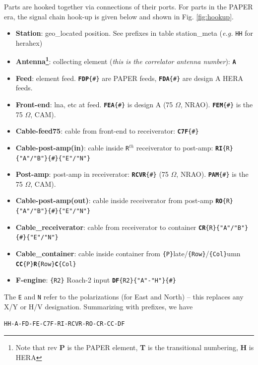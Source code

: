 \documentclass{article}[10pt]
\begin{document}
Parts are hooked together via connections of their ports.   For parts in the PAPER era, the signal chain hook-up is given below and shown in Fig. \ref{fig:hookup}.
\begin{itemize}\setlength\itemsep{-.3em}
	\item {\bf Station}: geo\_located position.  See prefixes in table station\_meta ({\em e.g.} {\tt HH} for herahex)
	\item {\bf Antenna\footnote{Note that rev {\bf P} is the PAPER element, {\bf T} is the transitional numbering, {\bf H} is HERA}}:  collecting element ({\em this is the correlator antenna number}):  {\tt{\bf A}}
	\item {\bf Feed}:  element feed.  {\tt {\bf FDP}\{\#\}} are PAPER feeds, {\tt {\bf FDA}\{\#\}} are design A HERA feeds.
	\item {\bf Front-end}:  lna, etc at feed.  {\tt {\bf FEA}\{\#\}} is design A (75 $\Omega$, NRAO).  {\tt {\bf FEM}\{\#\}} is the 75 $\Omega$, CAM).
	\item {\bf Cable-feed75}:  cable from front-end to receiverator: {\tt {\bf C7F}\{\#\}}
	\item {\bf Cable-post-amp(in)}:  cable inside {\tt R}$^{th}$ receiverator to post-amp: {\tt {\bf RI}\{R\}\{"A"/"B"\}\{\#\}\{"E"/"N"\}}
	\item {\bf Post-amp}:  post-amp in receiverator: {\tt {\bf RCVR}\{\#\}} (75 $\Omega$, NRAO).  {\tt {\bf PAM}\{\#\}} is the 75 $\Omega$, CAM).
	\item {\bf Cable-post-amp(out)}:  cable inside receiverator from post-amp {\tt {\bf RO}\{R\}\{"A"/"B"\}\{\#\}\{"E"/"N"\}}
	\item {\bf Cable\_receiverator}:  cable from receiverator to container {\tt {\bf CR}\{R\}\{"A"/"B"\}\{\#\}\{"E"/"N"\}}
	\item {\bf Cable\_container}:  cable inside container from {\tt\{P\}}late/{\tt\{Row\}}/{\tt\{Col\}}umn {\tt {\bf CC}\{P\}{\bf R}\{Row\}{\bf C}\{Col\}}
	\item {\bf F-engine}:  {\tt\{R2\}} Roach-2 input {\tt {\bf DF}\{R2\}\{"A"-"H"\}\{\#\}}
\end{itemize}
The {\tt E} and {\tt N} refer to the polarizations (for East and North) -- this replaces any X/Y or H/V designation.
Summarizing with prefixes, we have

\vspace{.15in}
\begin{center}
{\tt HH-A-FD-FE-C7F-RI-RCVR-RO-CR-CC-DF}
\end{center}
\vspace{.15in}
\end{document}
